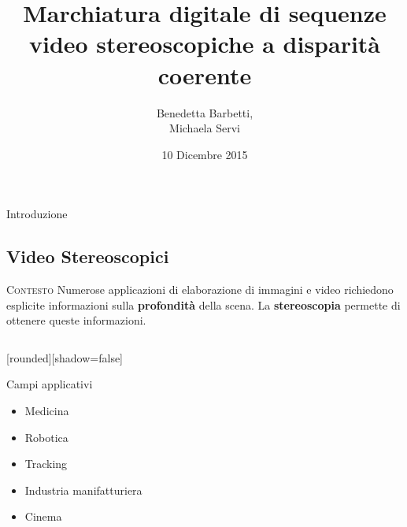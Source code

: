 \documentclass{beamer}
\title{Marchiatura digitale di sequenze video stereoscopiche a disparit\`{a} coerente }
\author{Benedetta Barbetti,\\ 
		Michaela Servi}
\institute{Universit\`{a} degli studi di Firenze}
\date{10 Dicembre 2015}
\begin{document}
\begin{frame}
\titlepage
\end{frame}

\begin{section}{Introduzione}
\subsection{Video Stereoscopici}

\begin{frame}[t]{\textsc{Contesto}}
\centering
Numerose applicazioni di elaborazione di immagini e video richiedono esplicite informazioni sulla \textbf{profondit\`{a}} della scena. La \textbf{stereoscopia} permette di ottenere queste informazioni.
\setlength{\columnsep}{0cm}
\begin{columns}
\begin{column}{4cm}
\begin{center}
[rounded][shadow=false]
\begin{block}{Campi applicativi}
		\begin{itemize}
			\item \small{Medicina} 
			\item Robotica
			\item Tracking
			\item Industria manifatturiera
			\item Cinema
		\end{itemize}	
	\end{block}
	


\end{center}
\end{column}
\end{columns}
\end{frame}
\end{section}
\end{document}
